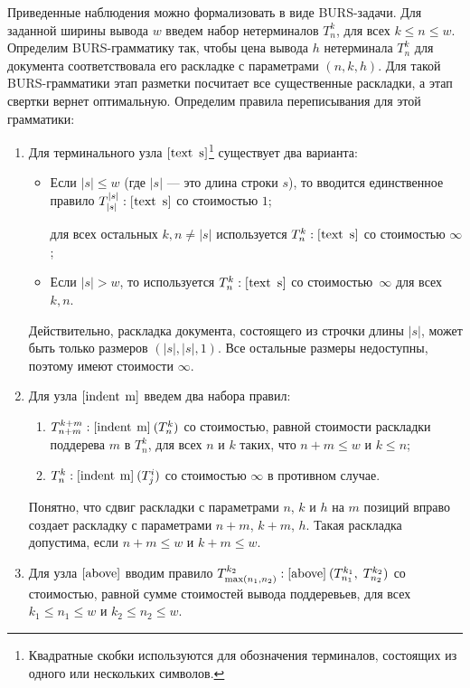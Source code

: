Приведенные наблюдения можно формализовать в виде BURS-задачи.
Для заданной ширины вывода $w$ введем набор нетерминалов
$T_n^k$, для всех $k \le n \le w$. Определим BURS-грамматику так, чтобы цена вывода $h$ нетерминала
$T_n^k$ для документа соответствовала его раскладке с параметрами $(n, k, h)$.
Для такой BURS-грамматики этап разметки посчитает все существенные раскладки, а этап свертки
вернет оптимальную. Определим правила переписывания для этой грамматики:
\begin{enumerate}
\item Для терминального узла $[\mbox{\lstinline{text s}}]$\footnote{
  Квадратные скобки используются для обозначения терминалов, состоящих из одного
  или нескольких символов.}
  существует два варианта:
  \begin{itemize}
     \item Если $|s|\le w$ (где $|s|$ --- это длина строки $s$), то вводится единственное правило
           $T^{|s|}_{|s|}: [\mbox{\lstinline{text s}}]$ со стоимостью $1$;
           
           для всех остальных
           $k, n\ne |s|$ используется $T^k_n:[\mbox{\lstinline{text s}}]$ со стоимостью $\infty$;
     \item Если $|s| > w$, то используется $T^k_n:[\mbox{\lstinline{text s}}]$ со стоимостью\
       $\infty$ для всех $k, n$.
  \end{itemize}
  Действительно, раскладка документа, состоящего из строчки длины $|s|$, может быть только размеров
  $(|s|, |s|, 1)$. Все остальные размеры недоступны, поэтому имеют стоимости $\infty$.

\item Для узла $[\mbox{\lstinline{indent m}}]$ введем два набора правил:
  \begin{enumerate}
     \item $T^{k+m}_{n+m}:[\mbox{\lstinline{indent m}}]\:(T^k_n)$ со стоимостью,
       равной стоимости раскладки поддерева $m$ в $T_n^k$, для всех $n$ 
     и $k$ таких, что $n+m\le w$ и $k\le n$;
     \item $T^k_n:[\mbox{\lstinline{indent m}}]\:(T^i_j)$ со стоимостью $\infty$ в противном случае.
  \end{enumerate}
  Понятно, что сдвиг раскладки с параметрами $n$, $k$ и $h$ на $m$ позиций вправо
  создает раскладку с параметрами $n+m$, $k+m$, $h$. Такая раскладка допустима, если
  $n+m\le w$ и $k+m\le w$.

\item Для узла $[\mbox{\lstinline{above}}]$ вводим правило $T^{k_2}_{\max(n_1, n_2)}:[\mbox{\lstinline{above}}]\:(T^{k_1}_{n_1},\;T^{k_2}_{n_2})$ 
со стоимостью, равной сумме стоимостей вывода поддеревьев,
для всех $k_1\le n_1\le w$ и $k_2 \le n_2 \le w$.


\end{enumerate}

